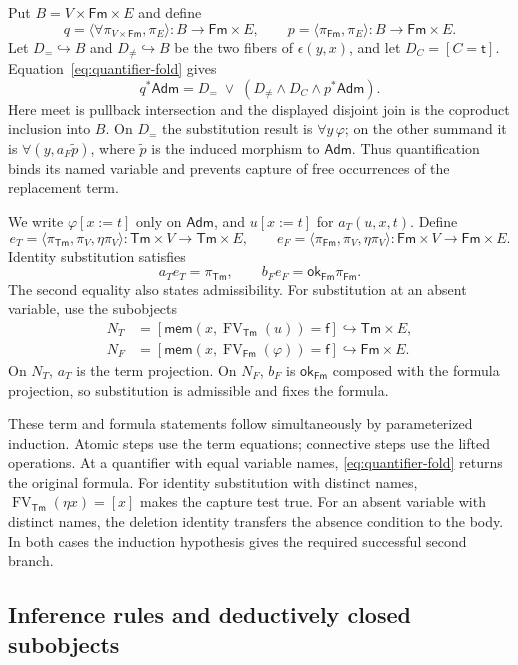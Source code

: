 \documentclass[11pt]{article}
\theoremstyle{definition}\newtheorem{definition}[theorem]{Definition}
\newcommand{\Tm}{\mathsf{Tm}}
\newcommand{\Fm}{\mathsf{Fm}}
\newcommand{\FV}{\operatorname{FV}}
\newcommand{\Adm}{\mathsf{Adm}}
\newcommand{\mem}{\mathsf{mem}}
\newcommand{\ok}{\mathsf{ok}}
\begin{document}
Put $B=V\times\Fm\times E$ and define
\[
 q=\langle\forall\pi_{V\times\Fm},\pi_E\rangle:B\to\Fm\times E,
 \qquad
 p=\langle\pi_{\Fm},\pi_E\rangle:B\to\Fm\times E.
\]
Let $D_=\hookrightarrow B$ and $D_{\ne}\hookrightarrow B$ be the
two fibers of $\epsilon(y,x)$, and let $D_C=[C=\mathsf t]$.
Equation~\eqref{eq:quantifier-fold} gives
\begin{equation}\label{eq:admissibility-subobjects}
 q^*\Adm=D_=\;\vee\;
           (D_{\ne}\wedge D_C\wedge p^*\Adm).
\end{equation}
Here meet is pullback intersection and the displayed disjoint join
is the coproduct inclusion into $B$. On $D_=$ the substitution
result is $\forall y\,\varphi$; on the other summand it is
$\forall(y,a_F\widetilde p)$, where
$\widetilde p$ is the induced morphism to $\Adm$.
Thus quantification binds its named variable and prevents capture
of free occurrences of the replacement term.

We write $\varphi[x:=t]$ only on $\Adm$, and $u[x:=t]$ for
$a_T(u,x,t)$. Define
\[
 e_T=\langle\pi_{\Tm},\pi_V,\eta\pi_V\rangle:
          \Tm\times V\to\Tm\times E,
 \qquad
 e_F=\langle\pi_{\Fm},\pi_V,\eta\pi_V\rangle:
          \Fm\times V\to\Fm\times E.
\]
Identity substitution satisfies
\[
 a_Te_T=\pi_{\Tm},\qquad b_Fe_F=\ok_{\Fm}\pi_{\Fm}.
\]
The second equality also states admissibility. For substitution at
an absent variable, use the subobjects
\begin{align*}
 N_T&=[\mem(x,\FV_{\Tm}(u))=\mathsf f]
                            \hookrightarrow\Tm\times E,\\
 N_F&=[\mem(x,\FV_{\Fm}(\varphi))=\mathsf f]
                            \hookrightarrow\Fm\times E.
\end{align*}
On $N_T$, $a_T$ is the term projection. On $N_F$, $b_F$ is
$\ok_{\Fm}$ composed with the formula projection, so substitution
is admissible and fixes the formula.

These term and formula statements follow simultaneously by
parameterized induction. Atomic steps use the term equations;
connective steps use the lifted operations. At a quantifier with
equal variable names, \eqref{eq:quantifier-fold} returns the original
formula. For identity substitution with distinct names,
$\FV_{\Tm}(\eta x)=[x]$ makes the capture test true.
For an absent variable with distinct names, the deletion identity
transfers the absence condition to the body. In both cases the
induction hypothesis gives the required successful second branch.

\subsection{Inference rules and deductively closed subobjects}
\label{app:closed-subobjects}
\end{document}
